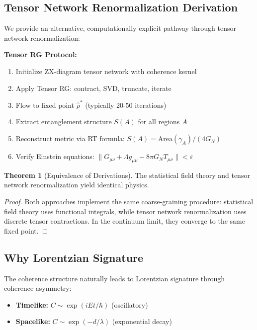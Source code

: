 \documentclass[11pt]{article}
\theoremstyle{definition}
\newtheorem{theorem}{Theorem}[section]
\newcommand{\density}{\rho}
\begin{document}
\subsection{Tensor Network Renormalization Derivation}

We provide an alternative, computationally explicit pathway through tensor network renormalization:

\textbf{Tensor RG Protocol:}
\begin{enumerate}
\item Initialize ZX-diagram tensor network with coherence kernel
\item Apply Tensor RG: contract, SVD, truncate, iterate
\item Flow to fixed point $\hat{\density}^*$ (typically 20-50 iterations)
\item Extract entanglement structure $S(A)$ for all regions $A$
\item Reconstruct metric via RT formula: $S(A) = \text{Area}(\gamma_A)/(4G_N)$
\item Verify Einstein equations: $\|G_{\mu\nu} + \Lambda g_{\mu\nu} - 8\pi G_N T_{\mu\nu}\| < \varepsilon$
\end{enumerate}

\begin{theorem}[Equivalence of Derivations]
The statistical field theory and tensor network renormalization yield identical physics.
\end{theorem}

\begin{proof}
Both approaches implement the same coarse-graining procedure: statistical field theory uses functional integrals, while tensor network renormalization uses discrete tensor contractions. In the continuum limit, they converge to the same fixed point.
\end{proof}

\subsection{Why Lorentzian Signature}

The coherence structure naturally leads to Lorentzian signature through coherence asymmetry:

\begin{itemize}
\item \textbf{Timelike:} $C \sim \exp(iEt/\hbar)$ (oscillatory)
\item \textbf{Spacelike:} $C \sim \exp(-d/\lambda)$ (exponential decay)
\end{itemize}
\end{document}
